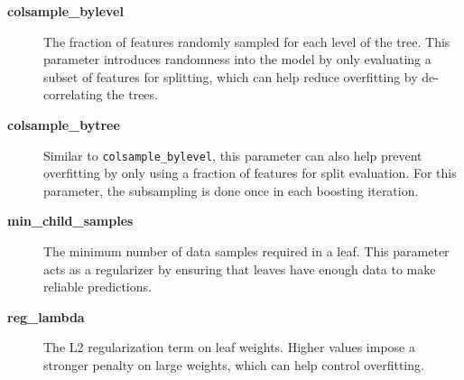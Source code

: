 \begin{description}
  \item[\textbf{colsample\_bylevel}] The fraction of features randomly sampled for each level of the tree. This parameter introduces randomness into the model by only evaluating a subset of features for splitting, which can help reduce overfitting by de-correlating the trees.
  
  \item[\textbf{colsample\_bytree}] Similar to \texttt{colsample\_bylevel}, this parameter can also help prevent overfitting by only using a fraction of features for split evaluation. For this parameter, the subsampling is done once in each boosting iteration.

  \item[\textbf{min\_child\_samples}] The minimum number of data samples required in a leaf. This parameter acts as a regularizer by ensuring that leaves have enough data to make reliable predictions.
  
  \item[\textbf{reg\_lambda}] The L2 regularization term on leaf weights. Higher values impose a stronger penalty on large weights, which can help control overfitting.
  
\end{description}
\label{appendix:GBDT-configs}
